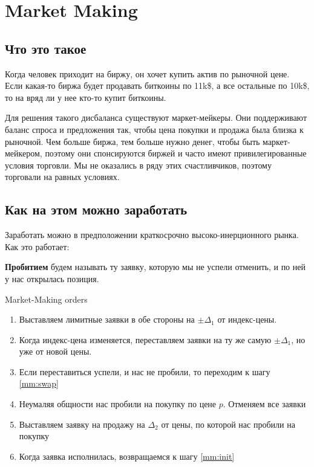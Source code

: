 \section{Market Making}
\subsection{Что это такое}

Когда человек приходит на биржу, он хочет купить актив по рыночной цене.
Если какая-то биржа будет продавать биткоины по 11k\$, а все остальные по 10k\$, то на вряд ли у нее кто-то купит биткоины.


Для решения такого дисбаланса существуют маркет-мейкеры. Они поддерживают баланс спроса и предложения так, чтобы цена покупки и продажа была близка к рыночной. Чем больше биржа, тем больше нужно денег, чтобы быть маркет-мейкером, поэтому они спонсируются биржей и часто имеют привилегированные условия торговли. Мы не оказались в ряду этих счастливчиков, поэтому торговали на равных условиях.

\subsection{Как на этом можно заработать}
Заработать можно в предположении краткосрочно высоко-инерционного рынка. Как это работает:

 \textbf{Пробитием} будем называть ту заявку, которую мы не успели отменить, и по ней у нас открылась позиция.

\begin{algorithm}
Market-Making orders
\begin{enumerate}

    \item \label{mm:init} Выставляем лимитные заявки в обе стороны на $\pm \Delta_1$ от индекс-цены.
    
    \item \label{mm:swap} Когда индекс-цена изменяется, переставляем заявки на ту же самую $\pm \Delta_1$, но уже от новой цены.
    
    \item Если переставиться успели, и нас не пробили, то переходим к шагу \ref{mm:swap}
    
    \item Неумаляя общности нас пробили на покупку по цене $p$. Отменяем все заявки
    
    \item Выставляем заявку на продажу на $\Delta_2$ от цены, по которой нас пробили на покупку
    
    \item \label{mm:win} Когда заявка исполнилась, возвращаемся к шагу \ref{mm:init}
    
\end{enumerate}
\end{algorithm}

